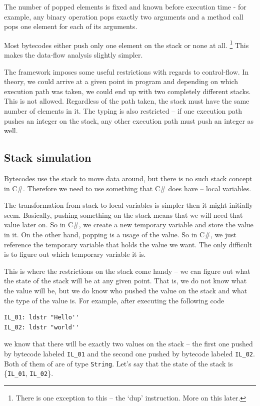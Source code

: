 \documentclass[12pt,twoside,notitlepage]{report}
\begin{document}
The number of popped elements is fixed and known before execution time
- for example, any binary operation pops exactly two arguments and
a method call pops one element for each of its arguments.

Most bytecodes either push only one element on the stack or none at all.%
\footnote{There is one exception to this -- the `dup' instruction.
More on this later.}
This makes the data-flow analysis slightly simpler.

The framework imposes some useful restrictions with regards to
control-flow.  In theory, we could arrive at a given point in program
and depending on which execution path was taken, we could end up with
two completely different stacks.  This is not allowed.  Regardless
of the path taken, the stack must have the same number of elements in it.
The typing is also restricted -- if one execution path pushes an integer
on the stack, any other execution path must push an integer as well.

\subsection{Stack simulation}

Bytecodes use the stack to move data around, but there is no such stack
concept in C\#.  Therefore we need to use something that C\# does 
have -- local variables.

The transformation from stack to local variables is simpler then 
it might initially seem.  Basically, pushing something on the
stack means that we will need that value later on.  So in C\#,
we create a new temporary variable and store the value in it.
On the other hand, popping is a usage of the value.  So in C\#, 
we just reference the temporary variable that
holds the value we want.  The only difficult is to figure out
which temporary variable it is.

This is where the restrictions on the stack come handy -- we can
figure out what the state of the stack will be at any given point.
That is, we do not know what the value will be, but we do know
who pushed the value on the stack and what the type of the value is.
For example, after executing the following code
\begin{verbatim}
IL_01: ldstr "Hello''
IL_02: ldstr "world''
\end{verbatim}
we know that there will be exactly two values on the stack -- 
the first one pushed by bytecode labeled \verb|IL_01| and the 
second one pushed by bytecode labeled \verb|IL_02|.  Both of
them of are of type \verb|String|.  Let's say that the state
of the stack is \{\verb|IL_01|, \verb|IL_02|\}.
\end{document}
